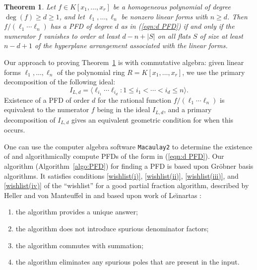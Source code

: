 \documentclass [a4paper,reqno, 11pt]{amsart}
\theoremstyle{plain}
\newtheorem{theorem}{Theorem}[section]
\theoremstyle{plain}
\theoremstyle{plain}
\theoremstyle{plain}
\theoremstyle{definition}
\theoremstyle{definition}
\theoremstyle{definition}
\theoremstyle{definition}
\theoremstyle{definition}
\theoremstyle{definition}
\begin{document}
\begin{theorem}\label{thm:intro-homog}
    Let $f\in K[x_1,\ldots,x_r]$ be a homogeneous polynomial of degree $\deg(f)\geq d\geq 1$, and let $\ell_1,\ldots,\ell_n$ be nonzero linear forms with $n\geq d$. 
    Then $f/(\ell_1\cdots\ell_n)$ has a PFD of degree $d$ as in (\ref{eqn:d PFD}) if and only if the numerator $f$ vanishes to order at least $d-n+|S|$ on all flats $S$ of size at least $n-d+1$ of the hyperplane arrangement associated with the linear forms. 
\end{theorem}



Our approach to proving Theorem~\ref{thm:intro-homog} is with commutative algebra: given linear forms $\ell_1,\ldots,\ell_n$ of the polynomial ring $R=K[x_1,\ldots,x_r]$, we use the primary decomposition of the following ideal:
\begin{equation}\label{eq:THE ideal}
    I_{L,d}=\langle \ell_{i_1}\cdots\ell_{i_d}:1\leq i_1<\cdots<i_d\leq n\rangle.
\end{equation}
Existence of a PFD of order $d$ for the rational function $f/(\ell_1\cdots\ell_n)$ is equivalent to the numerator $f$ being in the ideal $I_{L,d}$, and a primary decomposition of $I_{L,d}$ gives an equivalent geometric condition for when this occurs. 


One can use the computer algebra software \texttt{Macaulay2} \cite{M2} to determine the existence of and algorithmically compute PFDs of the form in 
(\ref{eqn:d PFD}). Our algorithm (Algorithm~\ref{algo:PFD}) for finding a PFD is based upon Gr\"obner basis algorithms. It satisfies conditions \ref{wishlist(i)}, \ref{wishlist(ii)}, \ref{wishlist(iii)}, and \ref{wishlist(iv)} of the ``wishlist'' for a good partial fraction algorithm, described by Heller and von Manteuffel in \cite[\S 2.3]{HvM} and based upon work of Le\u{\i}nartas \cite{Lei}:
\begin{enumerate}[label=(\roman*), ref=(\roman*)]
    \item \label{wishlist(i)}  the algorithm provides a unique answer;
    \item  \label{wishlist(ii)} the algorithm does not introduce spurious denominator factors;
    \item \label{wishlist(iii)} the algorithm commutes with summation;
    \item \label{wishlist(iv)} the algorithm eliminates any spurious poles that are present in the input.
\end{enumerate}
\end{document}
